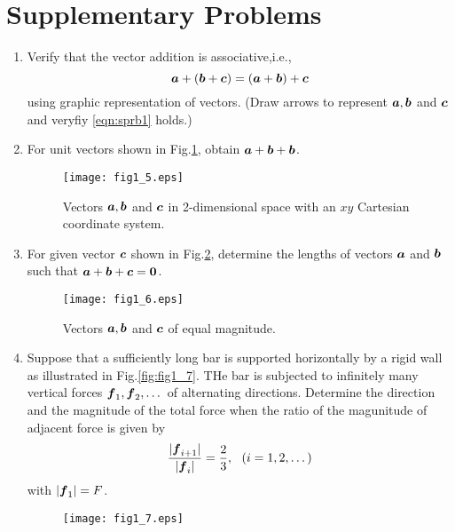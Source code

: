 \documentclass[10pt,a4j]{article}
\begin{document}
\section{Supplementary Problems}
\begin{enumerate}
\item
	Verify that the vector addition is associative,i.e., 
	\begin{equation}
		\mbox{\boldmath $a$}+(\mbox{\boldmath $b$}+\mbox{\boldmath $c$})= (\mbox{\boldmath $a$}+\mbox{\boldmath $b$})+\mbox{\boldmath $c$}
	\label{eqn:sprb1}
	\end{equation}
	using graphic representation of vectors. 
	(Draw arrows to represent $\mbox{\boldmath $a$},\mbox{\boldmath $b$}$ and $\mbox{\boldmath $c$}$ and veryfiy \ref{eqn:sprb1} holds.)
\item
	For unit vectors shown in Fig.\ref{fig:fig1_5}, obtain $\mbox{\boldmath $a$}+\mbox{\boldmath $b$}+\mbox{\boldmath $b$}$.  
	\begin{figure}[h]
	\begin{center}
	\texttt{[image: fig1\_5.eps]} 
	\end{center}
	\caption{Vectors $\mbox{\boldmath $a$}, \mbox{\boldmath $b$}$ and $\mbox{\boldmath $c$}$ in 2-dimensional space with an
	$xy$ Cartesian coordinate system.}
	\label{fig:fig1_5}
	\end{figure}
\item
	For given vector $\mbox{\boldmath $c$}$ shown in Fig.\ref{fig:fig1_6}, determine the lengths of vectors 
		$\mbox{\boldmath $a$}$ and $\mbox{\boldmath $b$}$ such that $\mbox{\boldmath $a$}+\mbox{\boldmath $b$}+\mbox{\boldmath $c$}=\mbox{\boldmath $0$}$.
	\begin{figure}[h]
	\begin{center}
	\texttt{[image: fig1\_6.eps]} 
	\end{center}
	\caption{Vectors $\mbox{\boldmath $a$}, \mbox{\boldmath $b$}$ and $\mbox{\boldmath $c$}$ of equal magnitude.} 
	\label{fig:fig1_6}
	\end{figure}
\item
	Suppose that a sufficiently long bar is supported horizontally by a rigid wall as 
	illustrated in Fig.\ref{fig:fig1_7}. THe bar is subjected to 
	infinitely many vertical forces $\mbox{\boldmath $f$}_1,\mbox{\boldmath $f$}_2,\dots $ of alternating 
	directions. Determine the direction and the magnitude of the total force 
	when the ratio of the magunitude of adjacent force is given by
	\begin{equation}
		\frac{| \mbox{\boldmath $f$}_{i+1}|}{|\mbox{\boldmath $f$}_i|}=\frac{2}{3}, \ \ (i=1,2,\dots)
		\label{eqn:}
	\end{equation}
	with $|\mbox{\boldmath $f$}_1|=F$.
	\begin{figure}[h]
	\begin{center}
	\texttt{[image: fig1\_7.eps]} 

\end{center}
\end{figure}
\end{enumerate}
\end{document}
